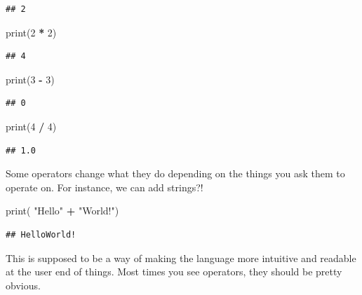 \documentclass[]{book}
\newenvironment{Shaded}{\begin{snugshade}}{\end{snugshade}}
\newcommand{\BuiltInTok}[1]{#1}
\newcommand{\DecValTok}[1]{\textcolor[rgb]{0.00,0.00,0.81}{#1}}
\newcommand{\NormalTok}[1]{#1}
\newcommand{\OperatorTok}[1]{\textcolor[rgb]{0.81,0.36,0.00}{\textbf{#1}}}
\newcommand{\StringTok}[1]{\textcolor[rgb]{0.31,0.60,0.02}{#1}}
\theoremstyle{definition}
\theoremstyle{definition}
\theoremstyle{definition}
\theoremstyle{remark}
\begin{document}
\begin{verbatim}
## 2
\end{verbatim}

\begin{Shaded}
\begin{Highlighting}[]
\BuiltInTok{print}\NormalTok{(}\DecValTok{2} \OperatorTok{*} \DecValTok{2}\NormalTok{)}
\end{Highlighting}
\end{Shaded}

\begin{verbatim}
## 4
\end{verbatim}

\begin{Shaded}
\begin{Highlighting}[]
\BuiltInTok{print}\NormalTok{(}\DecValTok{3} \OperatorTok{-} \DecValTok{3}\NormalTok{)}
\end{Highlighting}
\end{Shaded}

\begin{verbatim}
## 0
\end{verbatim}

\begin{Shaded}
\begin{Highlighting}[]
\BuiltInTok{print}\NormalTok{(}\DecValTok{4} \OperatorTok{/} \DecValTok{4}\NormalTok{)}
\end{Highlighting}
\end{Shaded}

\begin{verbatim}
## 1.0
\end{verbatim}

Some operators change what they do depending on the things you ask them
to operate on. For instance, we can add strings?!

\begin{Shaded}
\begin{Highlighting}[]
\BuiltInTok{print}\NormalTok{( }\StringTok{"Hello"} \OperatorTok{+} \StringTok{"World!"}\NormalTok{)}
\end{Highlighting}
\end{Shaded}

\begin{verbatim}
## HelloWorld!
\end{verbatim}

This is supposed to be a way of making the language more intuitive and
readable at the user end of things. Most times you see operators, they
should be pretty obvious.
\end{document}
